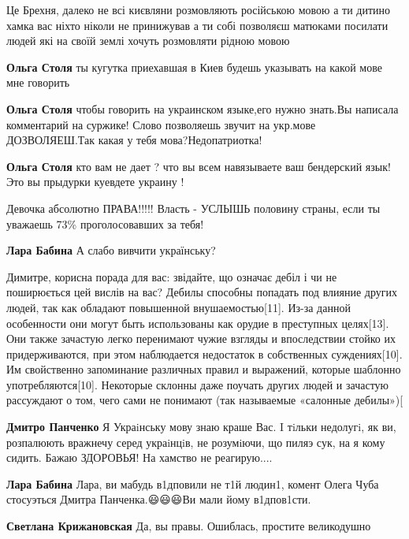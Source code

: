 \begin{itemize}
{

Це Брехня, далеко не всі києвляни розмовляють російською мовою а ти дитино
хамка вас ніхто ніколи не принижував а ти собі позволяєш матюками посилати
людей які на своїй землі хочуть розмовляти рідною мовою

\begin{itemize}
\textbf{Ольга Столя} ты кугутка приехавшая в Киев будешь указывать на какой мове мне говорить

\textbf{Ольга Столя} чтобы говорить на украинском языке,его нужно знать.Вы
написала комментарий на суржике! Слово позволяешь звучит на укр.мове
ДОЗВОЛЯЕШ.Так какая у тебя мова?Недопатриотка!

\textbf{Ольга Столя} кто вам не дает ? что вы всем навязываете ваш бендерский
язык! Это вы прыдурки куевдете украину !
\end{itemize}

Девочка абсолютно ПРАВА!!!!! Власть - УСЛЫШЬ половину страны, если ты уважаешь
73\% проголосовавших за тебя!

\begin{itemize}
\textbf{Лара Бабина} А слабо вивчити українську?

Димитре, корисна порада для вас: звідайте, що означає дебіл і чи не поширюється
цей вислів на вас?  Дебилы способны попадать под влияние других людей, так как
обладают повышенной внушаемостью[11]. Из-за данной особенности они могут быть
использованы как орудие в преступных целях[13]. Они также зачастую легко
перенимают чужие взгляды и впоследствии стойко их придерживаются, при этом
наблюдается недостаток в собственных суждениях[10]. Им свойственно запоминание
различных правил и выражений, которые шаблонно употребляются[10]. Некоторые
склонны даже поучать других людей и зачастую рассуждают о том, чего сами не
понимают (так называемые «салонные дебилы»)[

\textbf{Дмитро Панченко}
Я Украiнську мову знаю краше Вас. I тiльки недолугi, як ви, розпалюють вражнечу серед украiнцiв, не розумiючи, що пиляэ сук, на я кому сидить. Бажаю ЗДОРОВЬЯ! На хамство не реагирую....

\textbf{Лара Бабина} Лара, ви мабудь в1дповили не т1й людин1, комент Олега Чуба
стосуэться Дмитра Панченка.😃😃😃Ви мали йому в1дпов1сти.

\textbf{Светлана Крижановская}
Да, вы правы. Ошиблась, простите великодушно


\end{itemize}}
\end{itemize}
